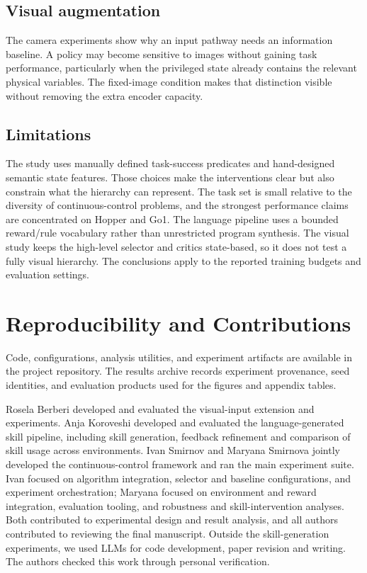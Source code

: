 \documentclass[conference,letterpaper,10pt]{IEEEtran}
\begin{document}
\subsection{Visual augmentation}
The camera experiments show why an input pathway needs an information baseline. A policy may become sensitive to images without gaining task performance, particularly when the privileged state already contains the relevant physical variables. The fixed-image condition makes that distinction visible without removing the extra encoder capacity.

\subsection{Limitations}
The study uses manually defined task-success predicates and hand-designed semantic state features. Those choices make the interventions clear but also constrain what the hierarchy can represent. The task set is small relative to the diversity of continuous-control problems, and the strongest performance claims are concentrated on Hopper and Go1. The language pipeline uses a bounded reward/rule vocabulary rather than unrestricted program synthesis. The visual study keeps the high-level selector and critics state-based, so it does not test a fully visual hierarchy. The conclusions apply to the reported training budgets and evaluation settings.

\section{Reproducibility and Contributions}
Code, configurations, analysis utilities, and experiment artifacts are available in the project repository. The results archive records experiment provenance, seed identities, and evaluation products used for the figures and appendix tables.

Rosela Berberi developed and evaluated the visual-input extension and experiments. Anja Koroveshi developed and evaluated the language-generated skill pipeline, including skill generation, feedback refinement and comparison of skill usage across environments. Ivan Smirnov and Maryana Smirnova jointly developed the continuous-control framework and ran the main experiment suite. Ivan focused on algorithm integration, selector and baseline configurations, and experiment orchestration; Maryana focused on environment and reward integration, evaluation tooling, and robustness and skill-intervention analyses. Both contributed to experimental design and result analysis, and all authors contributed to reviewing the final manuscript. Outside the skill-generation experiments, we used LLMs for code development, paper revision and writing. The authors checked this work through personal verification.
\end{document}
